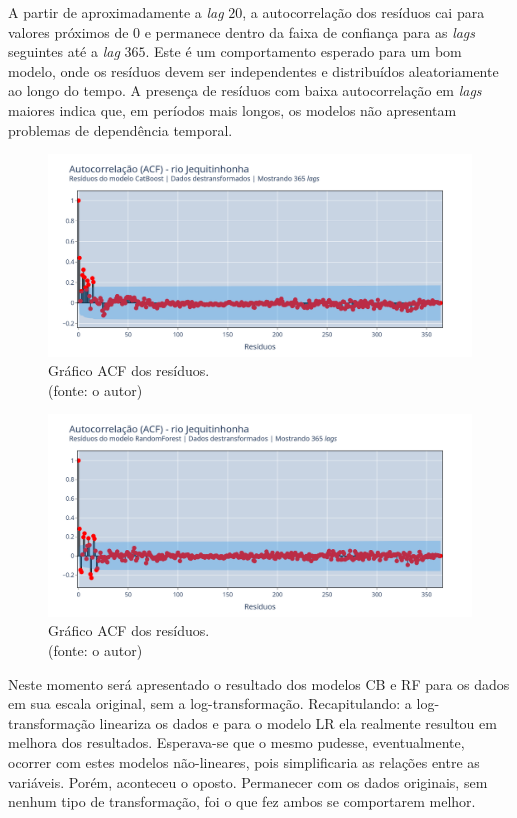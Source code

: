 A partir de aproximadamente a \textit{lag} $20$, a autocorrelação dos resíduos cai para valores próximos de $0$ e permanece dentro da faixa de confiança para as \textit{lags} seguintes até a \textit{lag} $365$. Este é um comportamento esperado para um bom modelo, onde os resíduos devem ser independentes e distribuídos aleatoriamente ao longo do tempo. A presença de resíduos com baixa autocorrelação em \textit{lags} maiores indica que, em períodos mais longos, os modelos não apresentam problemas de dependência temporal.

\begin{figure}[!h]
	\centering
	\includegraphics[scale=0.33]{Figuras/jequiti/wfv/CB/CB_WFV_LOG_RESID_ACF.png}
	\caption{Gráfico ACF dos resíduos.\\(fonte: o autor)}
	\label{fig:jequiti_CB_WFV_LOG_RESID_ACF}
\end{figure}

\begin{figure}[!h]
	\centering
	\includegraphics[scale=0.33]{Figuras/jequiti/wfv/RF/RF_WFV_LOG_RESID_ACF.png}
	\caption{Gráfico ACF dos resíduos.\\(fonte: o autor)}
	\label{fig:jequiti_RF_WFV_LOG_RESID_ACF}
\end{figure}
\clearpage

Neste momento será apresentado o resultado dos modelos CB e RF para os dados em sua escala original, sem a log-transformação. Recapitulando: a log-transformação lineariza os dados e para o modelo LR ela realmente resultou em melhora dos resultados. Esperava-se que o mesmo pudesse, eventualmente, ocorrer com estes modelos não-lineares, pois simplificaria as relações entre as variáveis. Porém, aconteceu o oposto. Permanecer com os dados originais, sem nenhum tipo de transformação, foi o que fez ambos se comportarem melhor.

